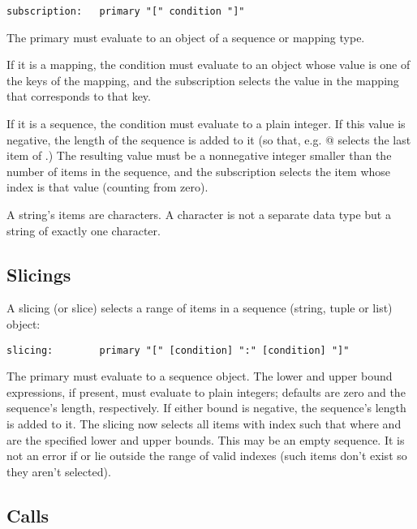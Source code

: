 \begin{verbatim}
subscription:   primary "[" condition "]"
\end{verbatim}

The primary must evaluate to an object of a sequence or mapping type.

If it is a mapping, the condition must evaluate to an object whose
value is one of the keys of the mapping, and the subscription selects
the value in the mapping that corresponds to that key.

If it is a sequence, the condition must evaluate to a plain integer.
If this value is negative, the length of the sequence is added to it
(so that, e.g. \verb@x[-1]@ selects the last item of \verb@x@.)
The resulting value must be a nonnegative integer smaller than the
number of items in the sequence, and the subscription selects the item
whose index is that value (counting from zero).

A string's items are characters.  A character is not a separate data
type but a string of exactly one character.

\subsection{Slicings}

A slicing (or slice) selects a range of items in a sequence (string,
tuple or list) object:

\begin{verbatim}
slicing:        primary "[" [condition] ":" [condition] "]"
\end{verbatim}

The primary must evaluate to a sequence object.  The lower and upper
bound expressions, if present, must evaluate to plain integers;
defaults are zero and the sequence's length, respectively.  If either
bound is negative, the sequence's length is added to it.  The slicing
now selects all items with index  such that
 where 
and  are the specified lower and upper bounds.  This may be an
empty sequence.  It is not an error if  or  lie outside the
range of valid indexes (such items don't exist so they aren't
selected).

\subsection{Calls} \label{calls}

